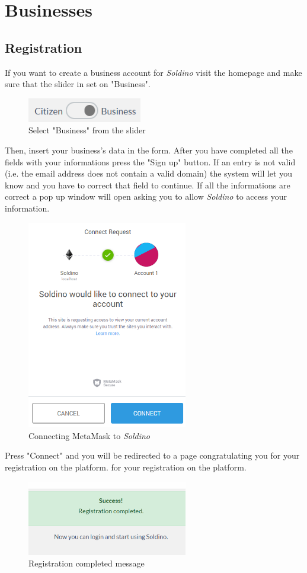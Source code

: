 \section{Businesses}
	\subsection{Registration}
	If you want to create a business account for \textit{Soldino} 
	visit the homepage and make sure that the slider in set on "Business".\\
	\begin{figure}[H]
		\includegraphics[width=5cm]{res/images/user_business.png}
		\centering
		\caption{Select "Business" from the slider}
	\end{figure}	
	\noindent Then, insert your business's data in the form. After you have completed 
	all the	fields with your informations press the "Sign up" button. If an 
	entry is not valid (i.e. the email address does not contain a valid 
	domain) the system will let you know and you have to correct that field 
	to continue. If all the informations are correct a pop up window will open 
	asking you to allow \textit{Soldino} to access your information.\\
	\begin{figure}[H]
		\includegraphics[width=7cm]{res/images/metamask_connect.png}
		\centering
		\caption{Connecting MetaMask to \textit{Soldino}}
	\end{figure}
	\noindent \noindent Press "Connect" and you will be redirected to a page 
	congratulating you for your registration on the platform.
	for your registration on the platform.
	\begin{figure}[H]
		\includegraphics[width=7cm]{res/images/registration_complete.png}
		\centering
		\caption{Registration completed message}
	\end{figure}
